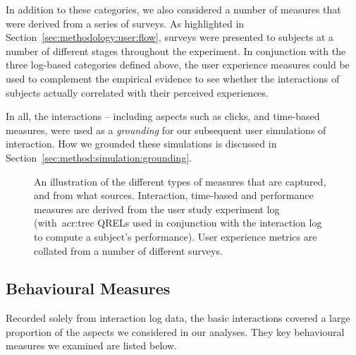 In addition to these categories, we also considered a number of  measures that were derived from a series of surveys. As highlighted in Section~\ref{sec:methodology:user:flow}, surveys were presented to subjects at a number of different stages throughout the experiment. In conjunction with the three log-based categories defined above, the user experience measures could be used to complement the empirical evidence to see whether the interactions of subjects actually correlated with their perceived experiences.

In all, the interactions -- including aspects such as clicks, and time-based measures, were used as a \emph{grounding} for our subsequent user simulations of interaction. How we grounded these simulations is discussed in Section~\ref{sec:method:simulation:grounding}.

\begin{figure}[t!]
    \centering
    \caption[Examples of evaluation measures]{An illustration of the different types of measures that are captured, and from what sources. Interaction, time-based and performance measures are derived from the user study experiment log (with~\gls{acr:trec} QRELs used in conjunction with the interaction log to compute a subject's performance). User experience metrics are collated from a number of different surveys.}
    \label{fig:evaluation_methodology}
\end{figure}

\vspace*{-3mm}
\subsection{Behavioural Measures}
Recorded solely from interaction log data, the basic interactions covered a large proportion of the aspects we considered in our analyses. They key behavioural measures we examined are listed below.

